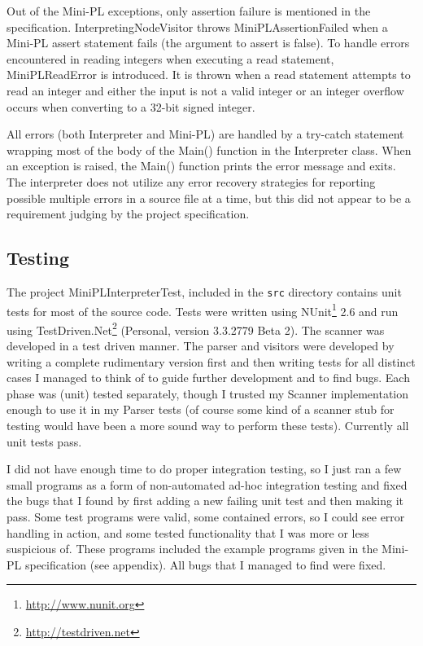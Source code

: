 \documentclass[a4paper,11pt]{article}
\begin{document}
Out of the Mini-PL exceptions, only assertion failure is mentioned in the specification. InterpretingNodeVisitor throws MiniPLAssertionFailed when a Mini-PL assert statement fails (the argument to assert is false). To handle errors encountered in reading integers when executing a read statement, MiniPLReadError is introduced. It is thrown when a read statement attempts to read an integer and either the input is not a valid integer or an integer overflow occurs when converting to a 32-bit signed integer.

All errors (both Interpreter and Mini-PL) are handled by a try-catch statement wrapping most of the body of the Main() function in the Interpreter class. When an exception is raised, the Main() function prints the error message and exits. The interpreter does not utilize any error recovery strategies for reporting possible multiple errors in a source file at a time, but this did not appear to be a requirement judging by the project specification.

\subsection{Testing}

The project MiniPLInterpreterTest, included in the \verb,src, directory contains unit tests for most of the source code. Tests were written using NUnit\footnote{\url{http://www.nunit.org}} 2.6 and run using TestDriven.Net\footnote{\url{http://testdriven.net}} (Personal, version 3.3.2779 Beta 2). The scanner was developed in a test driven manner. The parser and visitors were developed by writing a complete rudimentary version first and then writing tests for all distinct cases I managed to think of to guide further development and to find bugs. Each phase was (unit) tested separately, though I trusted my Scanner implementation enough to use it in my Parser tests (of course some kind of a scanner stub for testing would have been a more sound way to perform these tests). Currently all unit tests pass.

I did not have enough time to do proper integration testing, so I just ran a few small programs as a form of non-automated ad-hoc integration testing and fixed the bugs that I found by first adding a new failing unit test and then making it pass. Some test programs were valid, some contained errors, so I could see error handling in action, and some tested functionality that I was more or less suspicious of. These programs included the example programs given in the Mini-PL specification (see appendix). All bugs that I managed to find were fixed.
\end{document}
